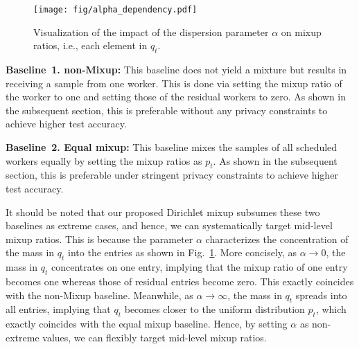 \documentclass[conference,10pt]{IEEEtran}
\theoremstyle{definition}
\theoremstyle{definition}
\begin{document}
\begin{figure}[t]
	\centering
	\texttt{[image: fig/alpha\_dependency.pdf]}
	\vspace{-2em}
	\caption{Visualization of the impact of the dispersion parameter $\alpha$ on mixup ratios, i.e., each element in $q_t$.}
	\label{fig:alpha_dependency}
	\vspace{-1.5em}
\end{figure}



\vspace{.3em}\noindent \textbf{Baseline~1. non-Mixup:}
This baseline does not yield a mixture but results in receiving a sample from one worker.
This is done via setting the mixup ratio of the worker to one and setting those of the residual workers to zero.
As shown in the subsequent section, this is preferable without any privacy constraints to achieve higher test accuracy.

\vspace{.3em}\noindent \textbf{Baseline~2. Equal mixup:}
This baseline mixes the samples of all scheduled workers equally by setting the mixup ratios as $p_t$.
As shown in the subsequent section, this is preferable under stringent privacy constraints to achieve higher test accuracy.

\vspace{.3em}
It should be noted that our proposed Dirichlet mixup subsumes these two baselines as extreme cases, and hence, we can systematically target mid-level mixup ratios.
This is because the parameter $\alpha$ characterizes the concentration of the mass in $q_t$ into the entries as shown in Fig.~\ref{fig:alpha_dependency}.
More concisely, as $\alpha\to 0$, the mass in $q_t$ concentrates on one entry, implying that the mixup ratio of one entry becomes one whereas those of residual entries become zero.
This exactly coincides with the non-Mixup baseline.
Meanwhile, as $\alpha\to \infty$, the mass in $q_t$ spreads into all entries, implying that $q_t$ becomes closer to the uniform distribution $p_t$, which exactly coincides with the equal mixup baseline.
Hence, by setting $\alpha$ as non-extreme values, we can flexibly target mid-level mixup ratios.

\vspace{-0.4em}
\end{document}
